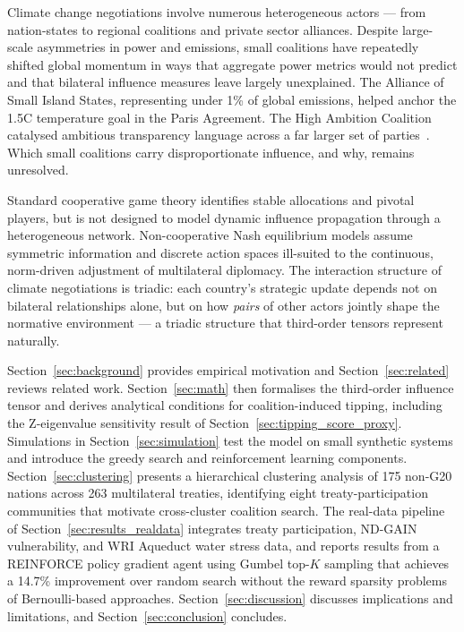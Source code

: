 \documentclass[11pt]{article}
\begin{document}
Climate change negotiations involve numerous heterogeneous actors --- from nation-states to regional coalitions and private sector alliances. Despite large-scale asymmetries in power and emissions, small coalitions have repeatedly shifted global momentum in ways that aggregate power metrics would not predict and that bilateral influence measures leave largely unexplained. The Alliance of Small Island States, representing under 1\% of global emissions, helped anchor the 1.5\textdegree C temperature goal in the Paris Agreement. The High Ambition Coalition catalysed ambitious transparency language across a far larger set of parties~\cite{yamin2021hac}. Which small coalitions carry disproportionate influence, and why, remains unresolved.

Standard cooperative game theory identifies stable allocations and pivotal players, but is not designed to model dynamic influence propagation through a heterogeneous network. Non-cooperative Nash equilibrium models assume symmetric information and discrete action spaces ill-suited to the continuous, norm-driven adjustment of multilateral diplomacy. The interaction structure of climate negotiations is triadic: each country's strategic update depends not on bilateral relationships alone, but on how \emph{pairs} of other actors jointly shape the normative environment --- a triadic structure that third-order tensors represent naturally.

Section~\ref{sec:background} provides empirical motivation and Section~\ref{sec:related} reviews related work. Section~\ref{sec:math} then formalises the third-order influence tensor and derives analytical conditions for coalition-induced tipping, including the Z-eigenvalue sensitivity result of Section~\ref{sec:tipping_score_proxy}. Simulations in Section~\ref{sec:simulation} test the model on small synthetic systems and introduce the greedy search and reinforcement learning components. Section~\ref{sec:clustering} presents a hierarchical clustering analysis of 175 non-G20 nations across 263 multilateral treaties, identifying eight treaty-participation communities that motivate cross-cluster coalition search. The real-data pipeline of Section~\ref{sec:results_realdata} integrates treaty participation, ND-GAIN vulnerability, and WRI Aqueduct water stress data, and reports results from a REINFORCE policy gradient agent using Gumbel top-$K$ sampling that achieves a 14.7\% improvement over random search without the reward sparsity problems of Bernoulli-based approaches. Section~\ref{sec:discussion} discusses implications and limitations, and Section~\ref{sec:conclusion} concludes.
\end{document}
